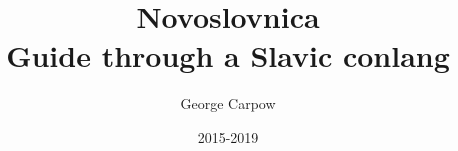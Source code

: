 \documentclass[a4paper,12pt]{book}
\begin{document}
\author{George Carpow}
\title{%
	Novoslovnica \\
	\large Guide through a Slavic conlang}
\date{2015-2019}

\frontmatter
\maketitle
\tableofcontents

\mainmatter



\backmatter
\end{document}
